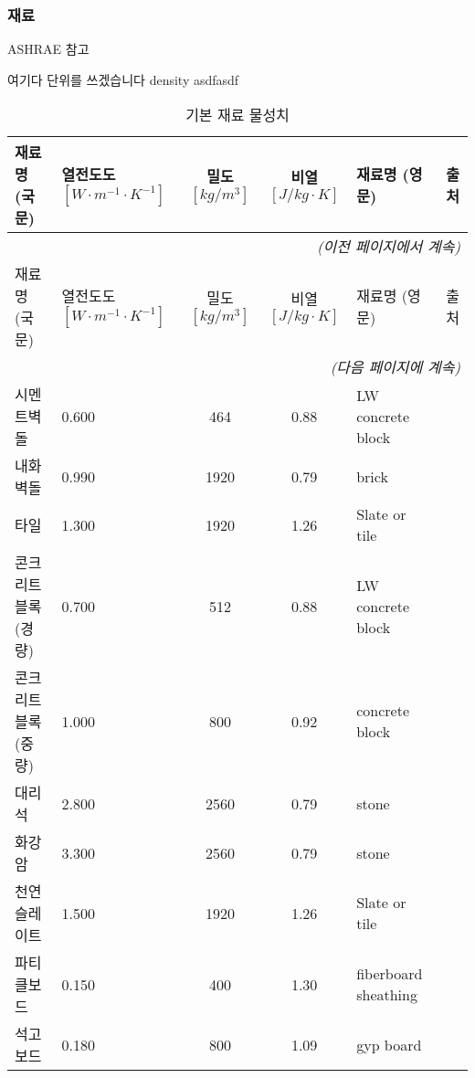 \subsubsection{재료}
ASHRAE 참고

여기다 단위를 쓰겠습니다 \unit{density} \unit{asdfasdf}

\renewcommand{\arraystretch}{0.9}
\begin{longtable}{llcclc}
  \caption{기본 재료 물성치} \\
  \toprule
  재료명(국문) & \makecell{열전도도 \\ $[W{\cdot}m^{-1}{\cdot} K^{-1}]$}  & \makecell{밀도 \\ $[kg/m^{3}]$} & \makecell {비열 \\ $[J/kg\cdot K]$} & 재료명 (영문) &  출처 \\ \midrule
  \endfirsthead
  \multicolumn{6}{r}{\textit{(이전 페이지에서 계속)}} \\ \toprule
  재료명(국문) & \makecell{열전도도 \\ $[W{\cdot}m^{-1}{\cdot} K^{-1}]$}  & \makecell{밀도 \\ $[kg/m^{3}]$} & \makecell {비열 \\ $[J/kg\cdot K]$} & 재료명 (영문) & 출처 \\ \midrule
  \endhead
  \midrule \multicolumn{6}{r}{\textit{(다음 페이지에 계속)}} \\ \bottomrule
  \endfoot
  \bottomrule
  \endlastfoot
  시멘트벽돌 &   0.600 &  464 & 0.88 & LW concrete block & \cite{ashrae_f18} \\
  내화벽돌 &   0.990 & 1920 & 0.79 & brick & \cite{ashrae_f18} \\
  타일 &   1.300 & 1920 & 1.26 & Slate or tile & \cite{ashrae_f18} \\
  콘크리트블록(경량) &   0.700 &  512 & 0.88 & LW concrete block & \cite{ashrae_f18} \\
  콘크리트블록(중량) &   1.000 &  800 & 0.92 & concrete block & \cite{ashrae_f18} \\
  대리석 &   2.800 & 2560 & 0.79 & stone & \cite{ashrae_f18} \\
  화강암 &   3.300 & 2560 & 0.79 & stone & \cite{ashrae_f18} \\
  천연슬레이트 &   1.500 & 1920 & 1.26 & Slate or tile & \cite{ashrae_f18} \\
  파티클보드 &   0.150 &  400 & 1.30 & fiberboard sheathing & \cite{ashrae_f18} \\
  석고보드 &   0.180 &  800 & 1.09 & gyp board & \cite{ashrae_f18} \\

\end{longtable}
